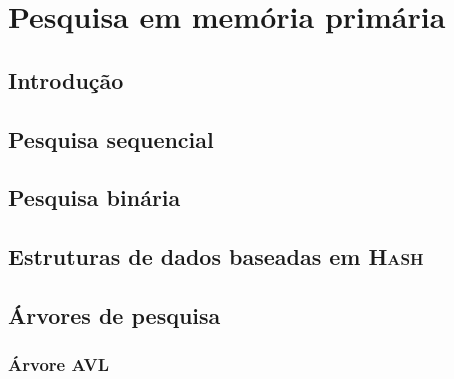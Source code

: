 \chapter{Pesquisa em memória primária}

\section{Introdução}

\section{Pesquisa sequencial}

\section{Pesquisa binária}

\section{Estruturas de dados baseadas em \textsc{Hash}}

\section{Árvores de pesquisa}

\subsection{Árvore AVL}

